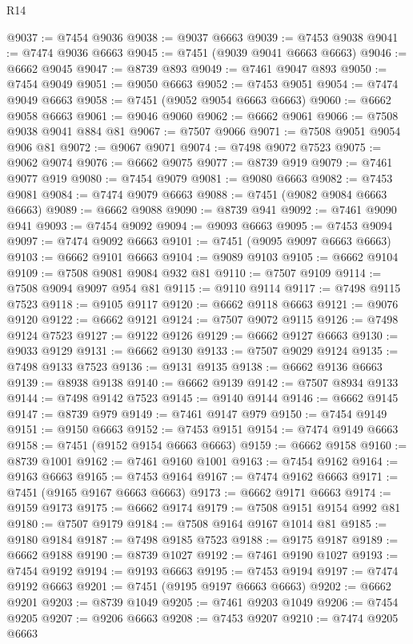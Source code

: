 \begin{lexlean}{R14}
\begin{coremodule}
@9037 := @7454 @9036
@9038 := @9037 @6663
@9039 := @7453 @9038
@9041 := @7474 @9036 @6663
@9045 := @7451 (@9039 @9041 @6663 @6663)
@9046 := @6662 @9045
@9047 := @8739 @893
@9049 := @7461 @9047 @893
@9050 := @7454 @9049
@9051 := @9050 @6663
@9052 := @7453 @9051
@9054 := @7474 @9049 @6663
@9058 := @7451 (@9052 @9054 @6663 @6663)
@9060 := @6662 @9058 @6663
@9061 := @9046 @9060
@9062 := @6662 @9061
@9066 := @7508 @9038 @9041 @884 @81
@9067 := @7507 @9066
@9071 := @7508 @9051 @9054 @906 @81
@9072 := @9067 @9071
@9074 := @7498 @9072 @7523
@9075 := @9062 @9074
@9076 := @6662 @9075
@9077 := @8739 @919
@9079 := @7461 @9077 @919
@9080 := @7454 @9079
@9081 := @9080 @6663
@9082 := @7453 @9081
@9084 := @7474 @9079 @6663
@9088 := @7451 (@9082 @9084 @6663 @6663)
@9089 := @6662 @9088
@9090 := @8739 @941
@9092 := @7461 @9090 @941
@9093 := @7454 @9092
@9094 := @9093 @6663
@9095 := @7453 @9094
@9097 := @7474 @9092 @6663
@9101 := @7451 (@9095 @9097 @6663 @6663)
@9103 := @6662 @9101 @6663
@9104 := @9089 @9103
@9105 := @6662 @9104
@9109 := @7508 @9081 @9084 @932 @81
@9110 := @7507 @9109
@9114 := @7508 @9094 @9097 @954 @81
@9115 := @9110 @9114
@9117 := @7498 @9115 @7523
@9118 := @9105 @9117
@9120 := @6662 @9118 @6663
@9121 := @9076 @9120
@9122 := @6662 @9121
@9124 := @7507 @9072 @9115
@9126 := @7498 @9124 @7523
@9127 := @9122 @9126
@9129 := @6662 @9127 @6663
@9130 := @9033 @9129
@9131 := @6662 @9130
@9133 := @7507 @9029 @9124
@9135 := @7498 @9133 @7523
@9136 := @9131 @9135
@9138 := @6662 @9136 @6663
@9139 := @8938 @9138
@9140 := @6662 @9139
@9142 := @7507 @8934 @9133
@9144 := @7498 @9142 @7523
@9145 := @9140 @9144
@9146 := @6662 @9145
@9147 := @8739 @979
@9149 := @7461 @9147 @979
@9150 := @7454 @9149
@9151 := @9150 @6663
@9152 := @7453 @9151
@9154 := @7474 @9149 @6663
@9158 := @7451 (@9152 @9154 @6663 @6663)
@9159 := @6662 @9158
@9160 := @8739 @1001
@9162 := @7461 @9160 @1001
@9163 := @7454 @9162
@9164 := @9163 @6663
@9165 := @7453 @9164
@9167 := @7474 @9162 @6663
@9171 := @7451 (@9165 @9167 @6663 @6663)
@9173 := @6662 @9171 @6663
@9174 := @9159 @9173
@9175 := @6662 @9174
@9179 := @7508 @9151 @9154 @992 @81
@9180 := @7507 @9179
@9184 := @7508 @9164 @9167 @1014 @81
@9185 := @9180 @9184
@9187 := @7498 @9185 @7523
@9188 := @9175 @9187
@9189 := @6662 @9188
@9190 := @8739 @1027
@9192 := @7461 @9190 @1027
@9193 := @7454 @9192
@9194 := @9193 @6663
@9195 := @7453 @9194
@9197 := @7474 @9192 @6663
@9201 := @7451 (@9195 @9197 @6663 @6663)
@9202 := @6662 @9201
@9203 := @8739 @1049
@9205 := @7461 @9203 @1049
@9206 := @7454 @9205
@9207 := @9206 @6663
@9208 := @7453 @9207
@9210 := @7474 @9205 @6663

\end{coremodule}
\end{lexlean}
